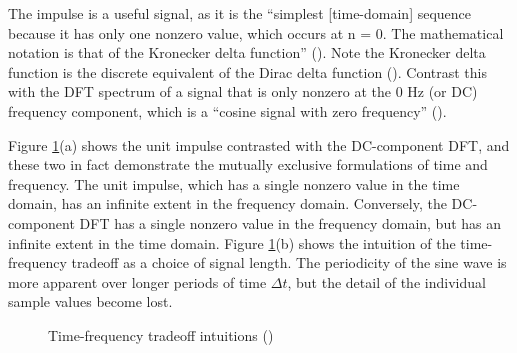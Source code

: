 \documentclass[report.tex]{subfiles}
\begin{document}
The impulse is a useful signal, as it is the ``simplest [time-domain] sequence because it has only one nonzero value, which occurs at n = 0. The mathematical notation is that of the Kronecker delta function'' (\cite[Chapter~5]{dspfirst}). Note the Kronecker delta function is the discrete equivalent of the Dirac delta function (\cite[Chapter~2]{melbook}). Contrast this with the DFT spectrum of a signal that is only nonzero at the 0 Hz (or DC) frequency component, which is a ``cosine signal with zero frequency'' (\cite[Chapter~3]{dspfirst}).

Figure \ref{fig:gaborfirst}(a) shows the unit impulse contrasted with the DC-component DFT, and these two in fact demonstrate the mutually exclusive formulations of time and frequency. The unit impulse, which has a single nonzero value in the time domain, has an infinite extent in the frequency domain. Conversely, the DC-component DFT has a single nonzero value in the frequency domain, but has an infinite extent in the time domain. Figure \ref{fig:gaborfirst}(b) shows the intuition of the time-frequency tradeoff as a choice of signal length. The periodicity of the sine wave is more apparent over longer periods of time $\Delta t$, but the detail of the individual sample values become lost.

\begin{figure}[ht]
	\centering
	\hspace{2em}
	\caption{Time-frequency tradeoff intuitions (\cite{gabor2})}
	\label{fig:gaborfirst}
\end{figure}
\end{document}
